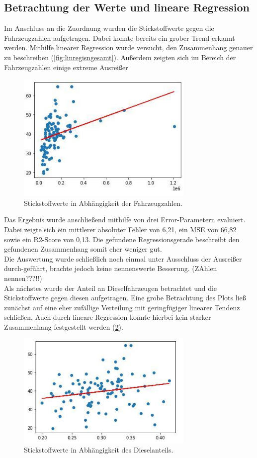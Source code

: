 \documentclass[11pt,a4paper,oneside,german]{article}
\begin{document}
	\subsection{Betrachtung der Werte und lineare Regression}
	
	Im Anschluss an die Zuordnung wurden die Stickstoffwerte gegen die Fahrzeugzahlen aufgetragen. Dabei konnte bereits ein grober Trend erkannt werden. Mithilfe linearer Regression wurde versucht, den Zusammenhang genauer zu beschreiben (\ref{fig:linregisngesamt}). Außerdem zeigten sich im Bereich der Fahrzeugzahlen einige extreme Ausreißer
	
	\begin{figure}[h!]
		\centering
		\includegraphics[width=8.5cm]{linreginsgesamt.jpg}
		\caption{Stickstoffwerte in Abhängigkeit der Fahrzeugzahlen.}
		\label{fig:linreginsgesamt}
	\end{figure}
	
	Das Ergebnis wurde anschließend mithilfe von drei Error-Parametern evaluiert. Dabei zeigte sich ein mittlerer absoluter Fehler von 6,21, ein MSE von 66,82 sowie ein R2-Score von 0,13. Die gefundene Regressionsgerade beschreibt den gefundenen Zusammenhang somit eher weniger gut. \\
	Die Auswertung wurde schließlich noch einmal unter Ausschluss der Ausreißer durch-geführt, brachte jedoch keine nennenswerte Besserung. (ZAhlen nennen???!!) \\
	Als nächstes wurde der Anteil an Dieselfahrzeugen betrachtet und die Stickstoffwerte gegen diesen aufgetragen. Eine grobe Betrachtung des Plots ließ zunächst auf eine eher zufällige Verteilung mit geringfügiger linearer Tendenz schließen. Auch durch lineare Regression konnte hierbei kein starker Zusammenhang festgestellt werden (\ref{fig:linregdieselanteil}).
	
	\begin{figure}[h!]
		\centering
		\includegraphics[width=8.5cm]{linregdieselanteil.jpg}
		\caption{Stickstoffwerte in Abhängigkeit des Dieselanteils.}
		\label{fig:linregdieselanteil}
	\end{figure}
	
\end{document}
